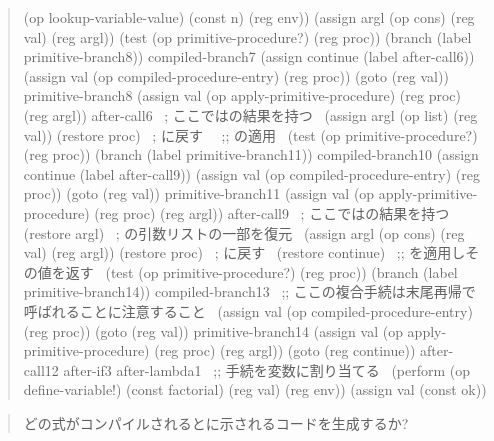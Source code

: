 \begin{quote}
\begin{smallscheme}
          (op lookup-variable-value) 
          (const n) 
          (reg env))
  (assign argl (op cons) (reg val) (reg argl))
  (test (op primitive-procedure?) (reg proc))
  (branch (label primitive-branch8))
compiled-branch7
  (assign continue (label after-call6))
  (assign val (op compiled-procedure-entry) (reg proc))
  (goto (reg val))
primitive-branch8
  (assign val 
          (op apply-primitive-procedure) 
          (reg proc) 
          (reg argl))
after-call6   ~\textrm{; ここではの結果を持つ}~
  (assign argl (op list) (reg val))
  (restore proc) ~\textrm{; に戻す}~
~\textrm{;; の適用}~
  (test (op primitive-procedure?) (reg proc))
  (branch (label primitive-branch11))
compiled-branch10
  (assign continue (label after-call9))
  (assign val (op compiled-procedure-entry) (reg proc))
  (goto (reg val))
primitive-branch11
  (assign val 
          (op apply-primitive-procedure) 
          (reg proc) 
          (reg argl))
after-call9      ~\textrm{; ここではの結果を持つ}~
  (restore argl) ~\textrm{; \code{*}の引数リストの一部を復元}~
  (assign argl (op cons) (reg val) (reg argl))
  (restore proc) ~\textrm{; \code{*}に戻す}~
  (restore continue)
~\textrm{;; \code{*}を適用しその値を返す}~
  (test (op primitive-procedure?) (reg proc))
  (branch (label primitive-branch14))
compiled-branch13
~\textrm{;; ここの複合手続は末尾再帰で呼ばれることに注意すること}~
  (assign val (op compiled-procedure-entry) (reg proc))
  (goto (reg val))
primitive-branch14
  (assign val 
          (op apply-primitive-procedure) 
          (reg proc) 
          (reg argl))
  (goto (reg continue))
after-call12
after-if3
after-lambda1
~\textrm{;; 手続を変数に割り当てる}~
  (perform (op define-variable!) 
           (const factorial) 
           (reg val) 
           (reg env))
  (assign val (const ok))
\end{smallscheme}

\end{quote}

\begin{quote}
どの式がコンパイルされるとに示されるコードを生成するか?
\end{quote}

